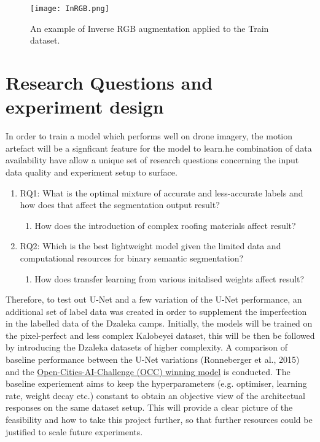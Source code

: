 \documentclass[11pt, a4paper, twoside]{report}
\begin{document}
\begin{figure}[H]
  \centering
  \texttt{[image: InRGB.png]}
  \caption{An example of Inverse RGB augmentation applied to the Train dataset.}
  \label{fig:InRGB}
\end{figure}


\section{Research Questions and experiment design}\label{RQ}

In order to train a model which performs well on drone imagery, the motion artefact will be a signficant feature for the model to learn.he combination of data availability have allow a unique set of research questions concerning the input data quality and experiment setup to surface.\\\par

\begin{enumerate}
  \item RQ1: What is the optimal mixture of accurate and less-accurate labels and how does that affect the segmentation output result?
    \begin{enumerate}
      \item How does the introduction of complex roofing materials affect result?
    \end{enumerate}
  \item RQ2: Which is the best lightweight model given the limited data and computational resources for binary semantic segmentation?
    \begin{enumerate}
      \item How does transfer learning from various initalised weights affect result?
    \end{enumerate}
\end{enumerate}

Therefore, to test out U-Net and a few variation of the U-Net performance, an additional set of label data was created in order to supplement the imperfection in the labelled data of the Dzaleka camps. Initially, the models will be trained on the pixel-perfect and less complex Kalobeyei dataset, this will be then be followed by introducing the Dzaleka datasets of higher complexity. A comparison of baseline performance between the U-Net variations (Ronneberger et al., 2015) and the \href{https://github.com/drivendataorg/open-cities-ai-challenge/tree/master/1st\%20Place}{Open-Cities-AI-Challenge (OCC) winning model} is conducted. The baseline experiement aims to keep the hyperparameters (e.g. optimiser, learning rate, weight decay etc.) constant to obtain an objective view of the architectual responses on the same dataset setup. This will provide a clear picture of the feasibility and how to take this project further, so that further resources could be justified to scale future experiments.\\\par
\end{document}
